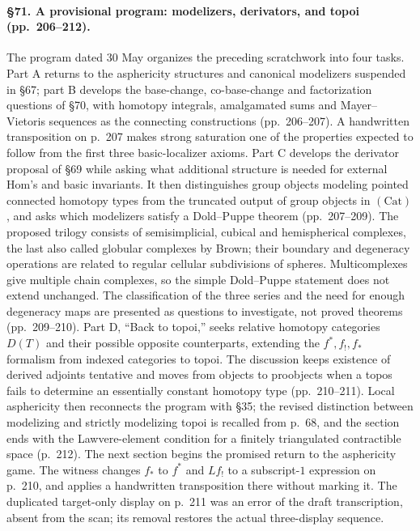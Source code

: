 \paragraph{\S71. A provisional program: modelizers, derivators, and topoi (pp.\ 206--212).}
The program dated 30 May organizes the preceding scratchwork into four tasks. Part A returns to the asphericity structures and canonical modelizers suspended in \S67; part B develops the base-change, co-base-change and factorization questions of \S70, with homotopy integrals, amalgamated sums and Mayer--Vietoris sequences as the connecting constructions (pp.\ 206--207). A handwritten transposition on p.\ 207 makes strong saturation one of the properties expected to follow from the first three basic-localizer axioms. Part C develops the derivator proposal of \S69 while asking what additional structure is needed for external Hom's and basic invariants. It then distinguishes group objects modeling pointed connected homotopy types from the truncated output of group objects in $(\mathrm{Cat})$, and asks which modelizers satisfy a Dold--Puppe theorem (pp.\ 207--209). The proposed trilogy consists of semisimplicial, cubical and hemispherical complexes, the last also called globular complexes by Brown; their boundary and degeneracy operations are related to regular cellular subdivisions of spheres. Multicomplexes give multiple chain complexes, so the simple Dold--Puppe statement does not extend unchanged. The classification of the three series and the need for enough degeneracy maps are presented as questions to investigate, not proved theorems (pp.\ 209--210). Part D, ``Back to topoi,'' seeks relative homotopy categories $D(T)$ and their possible opposite counterparts, extending the $f^*,f_!,f_*$ formalism from indexed categories to topoi. The discussion keeps existence of derived adjoints tentative and moves from objects to proobjects when a topos fails to determine an essentially constant homotopy type (pp.\ 210--211). Local asphericity then reconnects the program with \S35; the revised distinction between modelizing and strictly modelizing topoi is recalled from p.\ 68, and the section ends with the Lawvere-element condition for a finitely triangulated contractible space (p.\ 212). The next section begins the promised return to the asphericity game. The witness changes $f_*$ to $f^*$ and $Lf_!$ to a subscript-$1$ expression on p.\ 210, and applies a handwritten transposition there without marking it. The duplicated target-only display on p.\ 211 was an error of the draft transcription, absent from the scan; its removal restores the actual three-display sequence.
